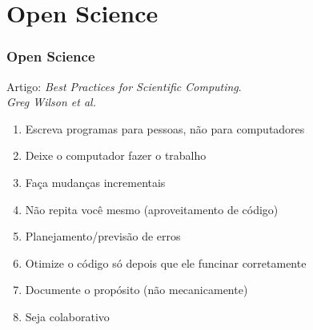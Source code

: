 \section{Open Science}


\begin{frame}
  \frametitle{Open Science}
  Artigo: \textit{Best Practices for Scientific Computing}. \\
          \textit{Greg Wilson et al.}
  \begin{enumerate}
    \item Escreva programas para pessoas, não para computadores
    \item Deixe o computador fazer o trabalho
    \item Faça mudanças incrementais
    \item Não repita você mesmo (aproveitamento de código)
    \item Planejamento/previsão de erros 
    \item Otimize o código só depois que ele funcinar corretamente
    \item Documente o propósito (não mecanicamente)
    \item Seja colaborativo
  \end{enumerate}
\end{frame}
